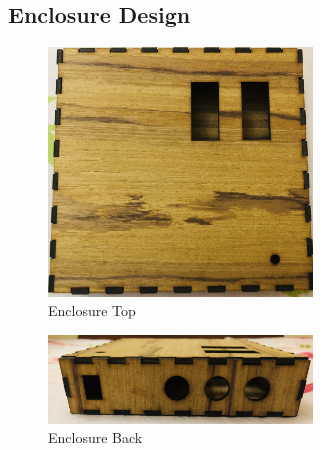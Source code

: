 \documentclass[a4paper,12pt]{article}
\begin{document}
\begin{multicols}{2}
\subsection{Enclosure Design}
\begin{figure}[H]
    \centering
    \includegraphics[width=7cm]{enclosure3.jpg}
    \caption{Enclosure Top}
    \label{fig:En Top}
\end{figure}
\begin{figure}[H]
    \centering
    \includegraphics[width=7cm]{enclosure2.jpg}
    \caption{Enclosure Back}
    \label{fig:En back}
\end{figure}
\end{multicols}
\end{document}
